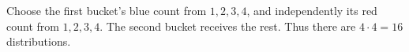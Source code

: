 Choose the first bucket's blue count from $1,2,3,4$, and independently its red count from $1,2,3,4$. The second bucket receives the rest. Thus there are $4\cdot 4=\boxed{16}$ distributions.
